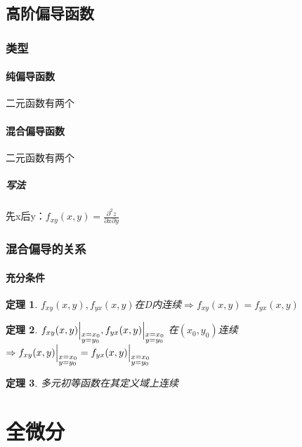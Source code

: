 \documentclass[UTF8,a4paper,12pt,scheme=chinese]{ctexbook}
\newtheorem{theorem}{定理}[section]
\theoremstyle{plain}
\begin{document}
	\subsection{高阶偏导函数}
	\subsubsection{类型}
	\paragraph{纯偏导函数}二元函数有两个
	\paragraph{混合偏导函数}二元函数有两个
	\subparagraph{写法}先x后y：$f_{xy}(x,y)=\frac{\partial^2 z}{\partial x \partial y}$
	\subsubsection{混合偏导的关系}
	\paragraph{充分条件}
	\begin{theorem}
		$f_{xy}(x,y),f_{yx}(x,y)$在D内连续$\Rightarrow f_{xy}(x,y)=f_{yx}(x,y)$
	\end{theorem}
	\begin{theorem}
		$
		f_{xy}(x,y)\Big|_{\begin{subarray}{l}x=x_0\\y=y_0\end{subarray}},
		f_{yx}(x,y)\Big|_{\begin{subarray}{l}x=x_0\\y=y_0\end{subarray}}$
		在$(x_0,y_0)$连续$\Rightarrow 
		f_{xy}(x,y)\Big|_{\begin{subarray}{l}x=x_0\\y=y_0\end{subarray}}=
		f_{yx}(x,y)\Big|_{\begin{subarray}{l}x=x_0\\y=y_0\end{subarray}}$
	\end{theorem}
	\begin{theorem}
		多元初等函数在其定义域上连续
	\end{theorem}
	\section{全微分}
\end{document}
